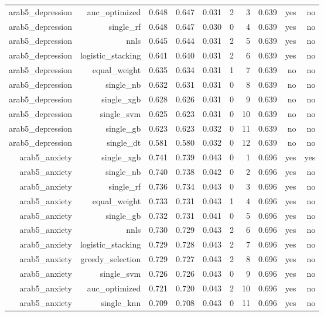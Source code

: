 \documentclass[10pt]{article}
\begin{document}
\begin{longtable}{rrrrrrrrrr}
arab5\_depression & auc\_optimized & 0.648 & 0.647 & 0.031 & 2 & 3 & 0.639 & yes & no \\
arab5\_depression & single\_rf & 0.648 & 0.647 & 0.030 & 0 & 4 & 0.639 & yes & no \\
arab5\_depression & nnls & 0.645 & 0.644 & 0.031 & 2 & 5 & 0.639 & yes & no \\
arab5\_depression & logistic\_stacking & 0.641 & 0.640 & 0.031 & 2 & 6 & 0.639 & yes & no \\
arab5\_depression & equal\_weight & 0.635 & 0.634 & 0.031 & 1 & 7 & 0.639 & no & no \\
arab5\_depression & single\_nb & 0.632 & 0.631 & 0.031 & 0 & 8 & 0.639 & no & no \\
arab5\_depression & single\_xgb & 0.628 & 0.626 & 0.031 & 0 & 9 & 0.639 & no & no \\
arab5\_depression & single\_svm & 0.625 & 0.623 & 0.031 & 0 & 10 & 0.639 & no & no \\
arab5\_depression & single\_gb & 0.623 & 0.623 & 0.032 & 0 & 11 & 0.639 & no & no \\
arab5\_depression & single\_dt & 0.581 & 0.580 & 0.032 & 0 & 12 & 0.639 & no & no \\
arab5\_anxiety & single\_xgb & 0.741 & 0.739 & 0.043 & 0 & 1 & 0.696 & yes & yes \\
arab5\_anxiety & single\_nb & 0.740 & 0.738 & 0.042 & 0 & 2 & 0.696 & yes & no \\
arab5\_anxiety & single\_rf & 0.736 & 0.734 & 0.043 & 0 & 3 & 0.696 & yes & no \\
arab5\_anxiety & equal\_weight & 0.733 & 0.731 & 0.043 & 1 & 4 & 0.696 & yes & no \\
arab5\_anxiety & single\_gb & 0.732 & 0.731 & 0.041 & 0 & 5 & 0.696 & yes & no \\
arab5\_anxiety & nnls & 0.730 & 0.729 & 0.043 & 2 & 6 & 0.696 & yes & no \\
arab5\_anxiety & logistic\_stacking & 0.729 & 0.728 & 0.043 & 2 & 7 & 0.696 & yes & no \\
arab5\_anxiety & greedy\_selection & 0.729 & 0.727 & 0.043 & 2 & 8 & 0.696 & yes & no \\
arab5\_anxiety & single\_svm & 0.726 & 0.726 & 0.043 & 0 & 9 & 0.696 & yes & no \\
arab5\_anxiety & auc\_optimized & 0.721 & 0.720 & 0.043 & 2 & 10 & 0.696 & yes & no \\
arab5\_anxiety & single\_knn & 0.709 & 0.708 & 0.043 & 0 & 11 & 0.696 & yes & no \\

\end{longtable}
\end{document}
